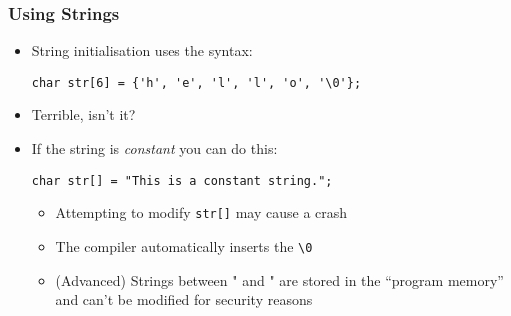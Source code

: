 \documentclass[14pt]{beamer}
\begin{document}

\begin{frame}[fragile]
\frametitle{Using Strings}
\begin{itemize}
\item String initialisation uses the syntax:
\begin{lstlisting}[style=CStyle]
char str[6] = {'h', 'e', 'l', 'l', 'o', '\0'};
\end{lstlisting}
\pause
\item Terrible, isn't it?
\pause
\item If the string is \textit{constant} you can do this:
\begin{lstlisting}[style=CStyle]
char str[] = "This is a constant string.";
\end{lstlisting}
	\begin{itemize}
		\item Attempting to modify \texttt{str[]} may cause a crash
		\item The compiler automatically inserts the \texttt{\textbackslash 0}
		\item (Advanced) Strings between " and " are stored in the ``program memory'' and can't be modified for security reasons
	\end{itemize}
\end{itemize}
\end{frame}
\end{document}
